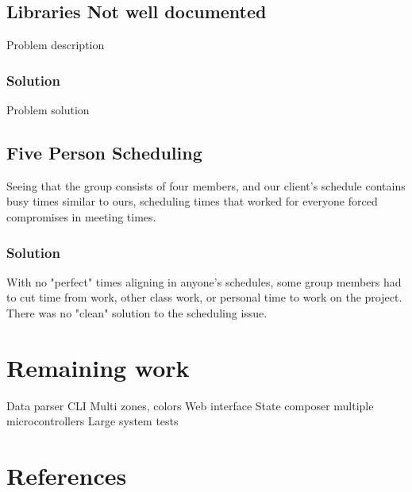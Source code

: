 \documentclass[onecolumn, draftclsnofoot,10pt, compsoc]{IEEEtran}
\begin{document}
	\subsection{Libraries Not well documented}
      Problem description
  	\subsubsection{Solution}
	    Problem solution
	 	\subsection{Five Person Scheduling}
		 Seeing that the group consists of four members, and our client's schedule contains busy times similar to ours, scheduling times that worked for everyone
		 forced compromises in meeting times.
  	\subsubsection{Solution}
		  With no "perfect" times aligning in anyone's schedules, some group members had to cut time from work, other class work, or personal time to work on the project.
		  There was no "clean" solution to the scheduling issue.


	\section{Remaining work}
	Data parser
	CLI Multi zones, colors
	Web interface
	State composer multiple microcontrollers
	Large system tests


	\section{References}
			\begingroup
				\renewcommand{\addcontentsline}[3]{}%
				\renewcommand{\section}[2]{}%
				
				
			\endgroup
\end{document}
